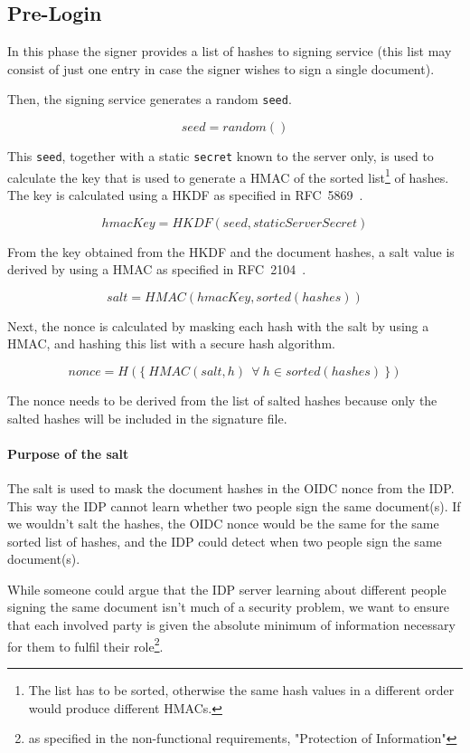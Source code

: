 \subsection{Pre-Login}\label{subsec:pre-login}
In this phase the signer provides a list of hashes to signing service
(this list may consist of just one entry in case the signer wishes to sign a single document).

Then, the signing service generates a random \texttt{seed}.

\[ seed = random() \]

This \texttt{seed}, together with a static \texttt{secret} known to the server only,
is used to calculate the key that is used to generate a \gls{HMAC}
of the sorted list\footnote{The list has to be sorted,
otherwise the same hash values in a different order would produce different \gls{HMAC}s.} of hashes.
The key is calculated using a \gls{HKDF} as specified in RFC~5869~\cite{rfc5869}.

\[ hmacKey = HKDF(seed, staticServerSecret) \]

From the key obtained from the \gls{HKDF} and the document hashes,
a salt value is derived by using a \gls{HMAC} as specified in RFC~2104~\cite{rfc2104}.

\[ salt = HMAC(hmacKey, sorted(hashes)) \]

Next, the nonce is calculated by masking each hash with the salt by using a \gls{HMAC},
and hashing this list with a secure hash algorithm.


\[ nonce = H(\{\ HMAC(salt, h) \ \ \forall \ h \in sorted(hashes)\ \}) \]

The nonce needs to be derived from the list of salted hashes because
only the salted hashes will be included in the signature file.


\paragraph{Purpose of the salt}
The salt is used to mask the document hashes in the \gls{OIDC} nonce from the \gls{IDP}.
This way the \gls{IDP} cannot learn whether two people sign the same document(s).
If we wouldn't salt the hashes, the \gls{OIDC} nonce would be the same for the same sorted list of hashes,
and the \gls{IDP} could detect when two people sign the same document(s).

While someone could argue that the IDP server learning about different people signing the same document
isn't much of a security problem, we want to ensure that each involved party is given the absolute minimum
of information necessary for them to fulfil their role\footnote{as specified in the non-functional requirements, "Protection of Information"}.

